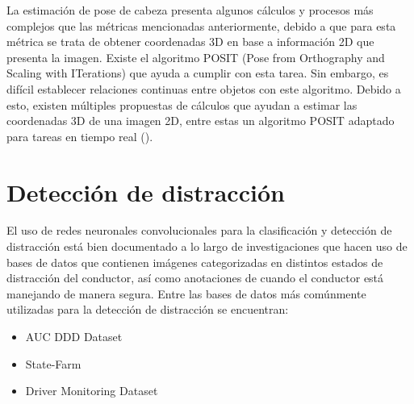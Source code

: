 La estimación de pose de cabeza presenta algunos cálculos y procesos más complejos que las métricas mencionadas anteriormente, debido a que para esta métrica se trata de obtener coordenadas 3D en base a información 2D que presenta la imagen. Existe el algoritmo POSIT (Pose from Orthography and Scaling with ITerations) que ayuda a cumplir con esta tarea. Sin embargo, es difícil establecer relaciones continuas entre objetos con este algoritmo. Debido a esto, existen múltiples propuestas de cálculos que ayudan a estimar las coordenadas 3D de una imagen 2D, entre estas un algoritmo POSIT adaptado para tareas en tiempo real (\cite{Cabeceo}). 


\section{Detección de distracción}
El uso de redes neuronales convolucionales para la clasificación y detección de distracción está bien documentado a lo largo de investigaciones que hacen uso de bases de datos que contienen imágenes categorizadas en distintos estados de distracción del conductor, así como anotaciones de cuando el conductor está manejando de manera segura. Entre las bases de datos más comúnmente utilizadas para la detección de distracción se encuentran: 

\begin{itemize}
    \item AUC DDD Dataset
    \item State-Farm
    \item Driver Monitoring Dataset
\end{itemize}

